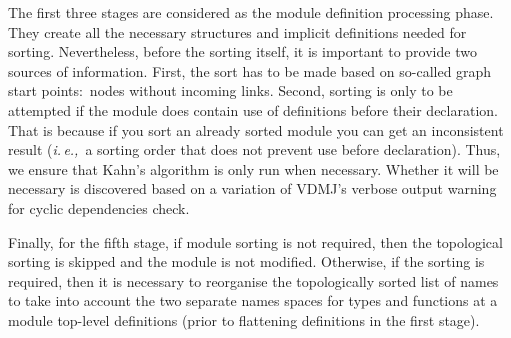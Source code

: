 \documentclass[runningheads,a4paper]{llncs}
\newcommand{\ie}{{\em i.\,e.,\/}}
\begin{document}
The first three stages are considered as the module definition processing phase. They create all the necessary structures and implicit definitions needed for sorting. Nevertheless, before the sorting itself, it is important to provide two sources of information. First, the sort has to be made based on so-called graph start points:~nodes without incoming links. Second, sorting is only to be attempted if the module does contain use of definitions before their declaration. That is because if you sort an already sorted module you can get an inconsistent result (\ie~a sorting order that does not prevent use before declaration). Thus, we ensure that Kahn's algorithm is only run when necessary. Whether it will be necessary is discovered based on a variation of VDMJ's verbose output warning for cyclic dependencies check.

Finally, for the fifth stage, if module sorting is not required, then the topological sorting is skipped and the module is not modified. Otherwise, if the sorting is required, then it is necessary to reorganise the topologically sorted list of names to take into account the two separate names spaces for types and functions at a module top-level definitions (prior to flattening definitions in the first stage). 
\end{document}
